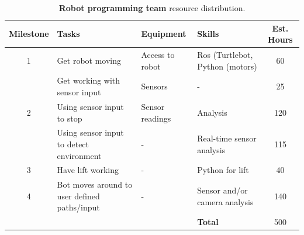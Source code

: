 \documentclass{article}
\begin{document}
\begin{table}[]
  \begin{center}
  \begin{small}
  \begin{tabular}{|c|l|l|l|c|}
    \hline
    {\bf Milestone} & {\bf Tasks} & {\bf Equipment} & {\bf Skills} & {\bf Est. Hours} \\ \hline
    1               & Get robot moving & Access to robot & Ros (Turtlebot, Python (motors) & 60 \\ \cline{2-5}
                    & Get working with sensor input & Sensors & - & 25 \\ \hline
    2               & Using sensor input to stop & Sensor readings & Analysis & 120 \\ \cline{2-5}
                    & Using sensor input to detect environment & - & Real-time sensor analysis & 115 \\ \hline
    3               & Have lift working & - & Python for lift & 40 \\ \hline
    4               & Bot moves around to user defined paths/input & - & Sensor and/or camera analysis & 140 \\ \hline
                    &  &  & {\bf Total} & 500 \\ \hline
  \end{tabular}
  \end{small}
  \caption{{\bf Robot programming team} resource distribution.}
  \end{center}
\end{table}
\end{document}
